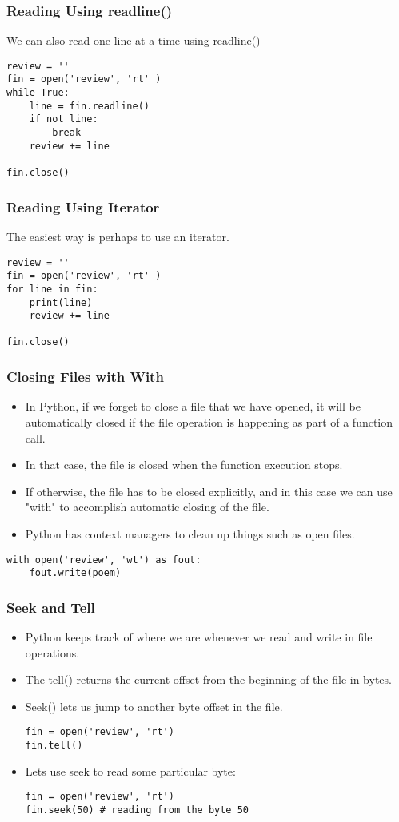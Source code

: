 \documentclass{beamer}
\begin{document}
\begin{frame}[fragile]
\frametitle{Reading Using readline()}
We can also read one line at a time using readline()
\begin{lstlisting}
review = ''
fin = open('review', 'rt' )
while True:
    line = fin.readline()
    if not line:
        break
    review += line

fin.close()
\end{lstlisting}
\end{frame}

\begin{frame}[fragile]
\frametitle{Reading Using Iterator}
The easiest way is perhaps to use an iterator.
\begin{lstlisting}
review = ''
fin = open('review', 'rt' )
for line in fin:
    print(line)
    review += line

fin.close()
\end{lstlisting}
\end{frame}

\begin{frame}[fragile]
\frametitle{Closing Files with With}

\begin{itemize}
\item In Python, if we forget to close a file that we have opened, it will be automatically closed if the file operation is happening as part of a function call.
\item In that case, the file is closed when the function execution stops.
\item If otherwise, the file has to be closed explicitly, and in this case we can use "with" to accomplish automatic closing of the file.
\item Python has context managers to clean up things such as open files.
\end{itemize}
\begin{lstlisting}
with open('review', 'wt') as fout:
    fout.write(poem)
\end{lstlisting}
\end{frame}


\begin{frame}[fragile]
\frametitle{Seek and Tell}
\begin{itemize}
\item Python keeps track of where we are whenever we read and write in file operations.
\item The tell() returns the current offset from the beginning of the file  in bytes.
\item Seek() lets us jump to another byte offset in the file.

\begin{lstlisting}
fin = open('review', 'rt')
fin.tell()
\end{lstlisting}
\item Lets use seek to read some particular byte:
\begin{lstlisting}
fin = open('review', 'rt')
fin.seek(50) # reading from the byte 50
\end{lstlisting}
\end{itemize}
\end{frame}
\end{document}
